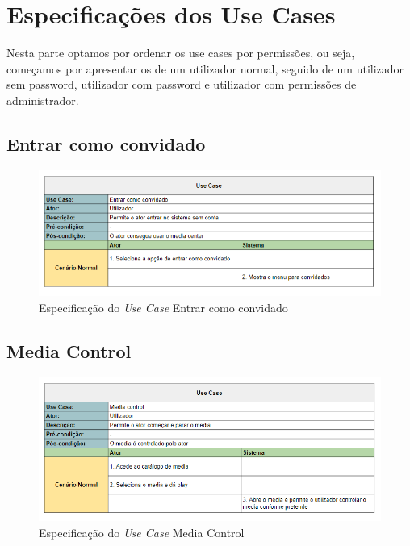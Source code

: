 \documentclass[a4paper]{report}
\begin{document}
\pagebreak

\section{Especificações dos Use Cases}

Nesta parte optamos por ordenar os use cases por permissões, ou seja, começamos
por apresentar os de um utilizador normal, seguido de um utilizador sem
password, utilizador com password e utilizador com permissões de administrador.

\subsection{Entrar como convidado}

\begin{figure}[H]
	\centering 
    \includegraphics[width=\textwidth]{images/Entrar_como_convidado.png}  
    \caption{Especificação do \emph{Use Case} Entrar como convidado}
\end{figure}

\subsection{Media Control}

\begin{figure}[H]
	\centering 
    \includegraphics[width=\textwidth]{images/Media_Control.png}  
    \caption{Especificação do \emph{Use Case} Media Control}
\end{figure}
\end{document}
